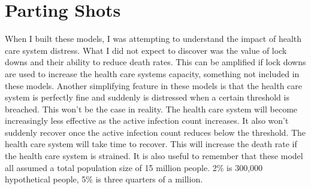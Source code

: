 \section{Parting Shots}
When I built these models, I was attempting to understand the impact of health care system distress. What I did not expect to discover was the value of lock downs and their ability to reduce death rates. This can be amplified if lock downs are used to increase the health care systems capacity, something not included in these models.
Another simplifying feature in these models is that the health care system is perfectly fine and suddenly is distressed when a certain threshold is breached. This won't be the case in reality. The health care system will become increasingly less effective as the active infection count increases. It also won't suddenly recover once the active infection count reduces below the threshold. The health care system will take time to recover. This will increase the death rate if the health care system is strained.
It is also useful to remember that these model all assumed a total population size of 15 million people. 2\% is 300,000 hypothetical people, 5\% is three quarters of a million. 